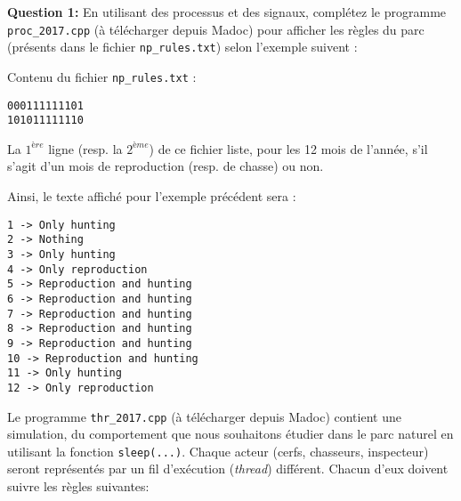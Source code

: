 \documentclass[CC,sansRappel,12pt]{tdtp-utf8}
\begin{document}
\begin{feuille}
\begin{exercice}
\textbf{Question 1:} En utilisant des processus et des signaux, complétez le programme \texttt{proc\_2017.cpp} (à télécharger depuis {\sc Madoc}) pour afficher les règles du parc (présents dans le fichier \texttt{np\_rules.txt}) selon l'exemple suivent :
\vspace{10pt}

Contenu du fichier \texttt{np\_rules.txt} :
\begin{Verbatim}
000111111101 
101011111110 
\end{Verbatim}

La $1^{ère}$ ligne (resp. la $2^{ème}$) de ce fichier liste, pour les 12 mois de l'année, s'il s'agit d'un mois de reproduction (resp. de chasse) ou non.

Ainsi, le texte affiché pour l'exemple précédent sera :

\begin{Verbatim}
1 -> Only hunting 
2 -> Nothing
3 -> Only hunting 
4 -> Only reproduction
5 -> Reproduction and hunting 
6 -> Reproduction and hunting 
7 -> Reproduction and hunting 
8 -> Reproduction and hunting 
9 -> Reproduction and hunting 
10 -> Reproduction and hunting 
11 -> Only hunting 
12 -> Only reproduction
\end{Verbatim}

\end{exercice}

\begin{exercice}

Le programme \texttt{thr\_2017.cpp} (à télécharger depuis {\sc Madoc}) contient une simulation, du comportement que nous souhaitons étudier dans le parc naturel en utilisant la fonction \texttt{sleep(...)}. Chaque acteur (cerfs, chasseurs, inspecteur) seront représentés par un fil d'exécution (\textit{thread}) différent. Chacun d'eux doivent suivre les règles suivantes:


\end{exercice}
\end{feuille}
\end{document}

